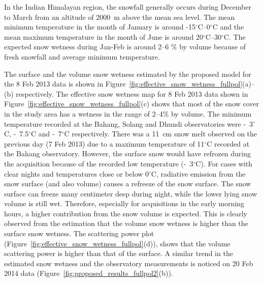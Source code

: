 In the Indian Himalayan region, the snowfall generally occurs during December to March from an altitude of 2000~m above the mean sea level. The mean minimum temperature in the month of January is around -15$^\circ$C--0$^\circ$C and the mean maximum temperature in the month of June is around 20$^\circ$C--30$^\circ$C. The expected snow wetness during Jan-Feb is around 2--6 $\%$ by volume because of fresh snowfall and average minimum temperature. 

The surface and the volume snow wetness estimated by the proposed model for the 8 Feb 2013 data is shown in Figure~\ref{fig:effective_snow_wetness_fullpol}(a)--(b) respectively. The effective snow wetness map for 8 Feb 2013 data shown in Figure~\ref{fig:effective_snow_wetness_fullpol}(c) shows that most of the snow cover in the study area has a wetness in the range of 2--4$\%$ by volume. The minimum temperature recorded at the Bahang, Solang and Dhundi observatories were -~3$^\circ$C, -~7.5$^\circ$C and -~7$^\circ$C respectively. There was a 11~cm snow melt observed on the previous day (7 Feb 2013) due to a maximum temperature of 11$^\circ$C recorded at the Bahang observatory. However, the surface snow would have refrozen during the acquisition because of the recorded low temperature (-~3$^\circ$C). For cases with clear nights and temperatures close or below 0$^\circ$C, radiative emission from the snow surface (and also volume) causes a refreeze of the snow surface. The snow surface can freeze many centimeter deep during night, while the lower lying snow volume is still wet. Therefore, especially for acquisitions in the early morning hours, a higher contribution from the snow volume is expected. This is clearly observed from the estimation that the volume snow wetness is higher than the surface snow wetness. The scattering power plot (Figure~\ref{fig:effective_snow_wetness_fullpol}(d)), shows that the volume scattering power is higher than that of the surface. A similar trend in the estimated snow wetness and the observatory measurements is noticed on 20 Feb 2014 data (Figure~\ref{fig:proposed_results_fullpol2}(b)).

